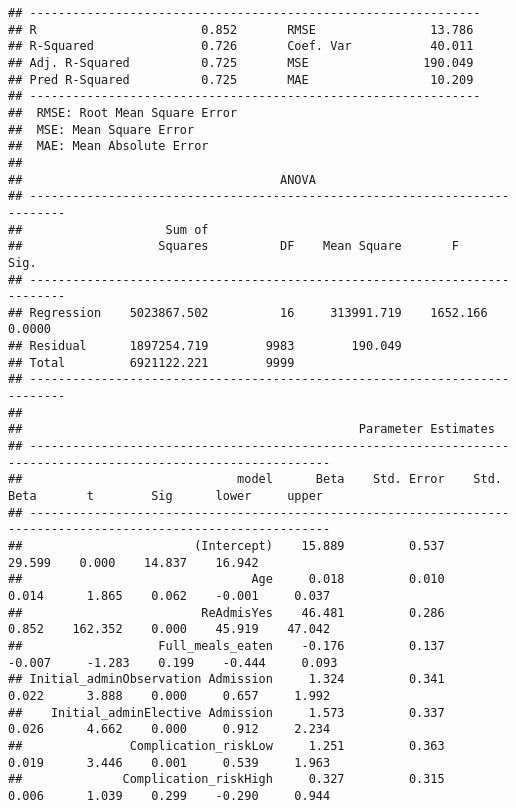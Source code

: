 \documentclass[
]{article}
\begin{document}
\begin{verbatim}
## ---------------------------------------------------------------
## R                       0.852       RMSE                13.786 
## R-Squared               0.726       Coef. Var           40.011 
## Adj. R-Squared          0.725       MSE                190.049 
## Pred R-Squared          0.725       MAE                 10.209 
## ---------------------------------------------------------------
##  RMSE: Root Mean Square Error 
##  MSE: Mean Square Error 
##  MAE: Mean Absolute Error 
## 
##                                    ANOVA                                    
## ---------------------------------------------------------------------------
##                    Sum of                                                  
##                   Squares          DF    Mean Square       F          Sig. 
## ---------------------------------------------------------------------------
## Regression    5023867.502          16     313991.719    1652.166    0.0000 
## Residual      1897254.719        9983        190.049                       
## Total         6921122.221        9999                                      
## ---------------------------------------------------------------------------
## 
##                                               Parameter Estimates                                                
## ----------------------------------------------------------------------------------------------------------------
##                              model      Beta    Std. Error    Std. Beta       t        Sig      lower     upper 
## ----------------------------------------------------------------------------------------------------------------
##                        (Intercept)    15.889         0.537                  29.599    0.000    14.837    16.942 
##                                Age     0.018         0.010        0.014      1.865    0.062    -0.001     0.037 
##                         ReAdmisYes    46.481         0.286        0.852    162.352    0.000    45.919    47.042 
##                   Full_meals_eaten    -0.176         0.137       -0.007     -1.283    0.199    -0.444     0.093 
## Initial_adminObservation Admission     1.324         0.341        0.022      3.888    0.000     0.657     1.992 
##    Initial_adminElective Admission     1.573         0.337        0.026      4.662    0.000     0.912     2.234 
##               Complication_riskLow     1.251         0.363        0.019      3.446    0.001     0.539     1.963 
##              Complication_riskHigh     0.327         0.315        0.006      1.039    0.299    -0.290     0.944 

\end{verbatim}
\end{document}
